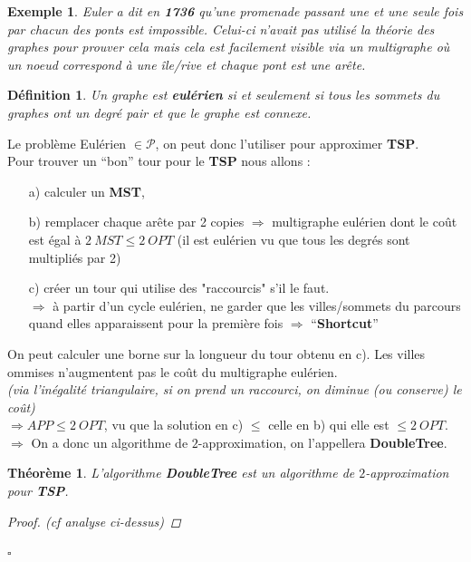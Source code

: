 \documentclass{article}
\newcommand{\titre}[1]{\textcolor{title}{#1}}
\newcommand{\cqfd}{\begin{flushright}$\square$\end{flushright}}
\newtheorem{de}{D\'efinition}[section]
\newtheorem{exemple}{Exemple}[section]
\newtheorem{thm}{Th\'eor\`eme}[section]
\newtheorem{proof}{Preuve}[section]
\begin{document}
\begin{sffamily}
\begin{exemple}
Euler a dit en \textbf{1736} qu'une promenade passant une et une seule fois par chacun des ponts est impossible.
Celui-ci n'avait pas utilisé la théorie des graphes pour prouver cela mais cela est facilement visible via un multigraphe où un noeud
correspond à une île/rive et chaque pont est une arête.
\end{exemple}

\begin{de}
Un graphe est \textbf{eulérien} si et seulement si tous les sommets du graphes ont un degré pair et que le graphe est connexe.
\end{de}

\noindent Le problème Eulérien $\in \mathcal{P}$, on peut donc l'utiliser pour approximer \textbf{\titre{TSP}}.\\
Pour trouver un ``bon'' tour pour le \textbf{\titre{TSP}} nous allons :
\begin{enumerate}
\item[a)] calculer un \textbf{\titre{MST}},
\item[b)] remplacer chaque arête par 2 copies $\Rightarrow$ multigraphe eulérien dont le coût est égal à $2\ MST\leq 2\ OPT$
(il est eulérien vu que tous les degrés sont multipliés par 2)
\item[c)] créer un tour qui utilise des "raccourcis" s'il le faut. \\
$\Rightarrow$ à partir d'un cycle eulérien, ne garder que les villes/sommets du parcours quand elles apparaissent pour la première fois
$\Rightarrow$ ``\textbf{Shortcut}''\\
\end{enumerate}
On peut calculer une borne sur la longueur du tour obtenu en c). Les villes ommises n'augmentent pas le coût du multigraphe eulérien. \\
\textit{(via l'inégalité triangulaire, si on prend un raccourci, on diminue (ou conserve) le coût)} \\
$\Rightarrow APP \leq 2\ OPT$, vu que la solution en c) $\leq$ celle en b) qui elle est $\leq 2\ OPT$. \\
$\Longrightarrow$ On a donc un algorithme de $2$-approximation, on l'appellera \textbf{DoubleTree}.

\begin{thm}
L'algorithme \textbf{DoubleTree} est un algorithme de $2$-approximation pour \textbf{\titre{TSP}}.
\begin{proof} (cf analyse ci-dessus)
\end{proof}
\cqfd
\end{thm}


\end{sffamily}
\end{document}
